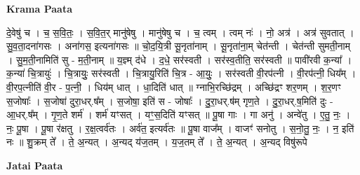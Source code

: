 \documentclass[17pt]{extarticle}
\begin{document}
\textbf{Krama Paata} \newline

दे॒वेषु॑ च । च॒ स॒वि॒तः॒ । स॒वि॒त॒र् मानु॑षेषु । मानु॑षेषु च । च॒ त्वम् । त्वम् नः॑ । नो॒ अत्र॑ । अत्र॑ सुवतात् । सु॒व॒ता॒दना॑गसः । अना॑गस॒ इत्यना॑गसः ॥ चो॒द॒यि॒त्री सू॒नृता॑नाम् । सू॒नृता॑ना॒म् चेत॑न्ती । चेत॑न्ती सुमती॒नाम् । सु॒म॒ती॒नामिति॑ सु - म॒ती॒नाम् ॥ य॒ज्ञ्म् द॑धे । द॒धे॒ सर॑स्वती । सर॑स्व॒तीति॒ सर॑स्वती ॥ पावी॑रवी क॒न्या᳚ । क॒न्या॑ चि॒त्रायुः॑ । चि॒त्रायुः॒ सर॑स्वती । चि॒त्रायु॒रिति॑ चि॒त्र - आ॒युः॒ । सर॑स्वती वी॒रप॑त्नी । वी॒रप॑त्नी॒ धिय᳚म् । वी॒रप॒त्नीति॑ वी॒र - प॒त्नी॒ । धिय॑म् धात् । धा॒दिति॑ धात् ॥ ग्नाभि॒रच्छि॑द्रम् । अच्छि॑द्रꣳ शर॒णम् । श॒र॒णꣳ स॒जोषाः᳚ । स॒जोषा॑ दुरा॒धर्.ष᳚म् । स॒जोषा॒ इति॑ स - जोषाः᳚ । दु॒रा॒धर्.ष॑म् गृण॒ते । दु॒रा॒धर्.ष॒मिति॑ दुः - आ॒धर्.ष᳚म् । गृ॒ण॒ते शर्म॑ । शर्म॑ यꣳसत् । यꣳ॒॒स॒दिति॑ यꣳसत् ॥ पू॒षा गाः । गा अनु॑ । अन्वे॑तु । ए॒तु॒ नः॒ । नः॒ पू॒षा । पू॒षा र॑क्षतु । र॒क्ष॒त्वर्व॑तः । अर्व॑त॒ इत्यर्व॑तः ॥ पू॒षा वाज᳚म् । वाजꣳ॑ सनोतु । स॒नो॒तु॒ नः॒ । न॒ इति॑ नः ॥ शु॒क्रम् ते᳚ । ते॒ अ॒न्यत् । अ॒न्यद् य॑ज॒तम् । य॒ज॒तम् ते᳚ । ते॒ अ॒न्यत् । अ॒न्यद् विषु॑रूपे \newline

\textbf{Jatai Paata} \newline
\end{document}
